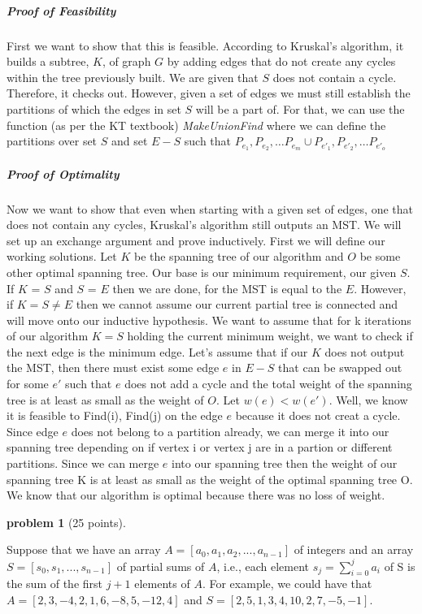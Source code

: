 \documentclass[10pt]{article}
\newtheorem{problem}{\sc\color{cit}problem}
\begin{document}
{\subparagraph{Proof of Feasibility} First we want to show that this is feasible. According to Kruskal's algorithm, it builds a subtree, $K$, of graph $G$ by adding edges that do not create any cycles within the tree
previously built. We are given that $S$ does not contain a cycle. Therefore, it checks out. However, given a set of edges we must still establish the partitions of which the edges in set $S$ will be a part of. 
For that, we can use the function (as per the KT textbook) \textit{MakeUnionFind} where we can define the partitions over set $S$ and set $E - S$ such that ${P_{e_1}, P_{e_2}, \ldots P_{e_m}} \cup {P_{e'_1}, P_{e'_2}, \ldots P_{e'_o}}$ 

\subparagraph{Proof of Optimality} Now we want to show that even when starting with a given set of edges, one that does not contain any cycles, Kruskal's algorithm still outputs an MST. We will set up an exchange argument and prove inductively. 
First we will define our working solutions. Let $K$ be the spanning tree of our algorithm and $O$ be some other optimal spanning tree. Our base is our minimum requirement, our given $S$. If $K$ = $S$ and $S$ = $E$ then we are done,
for the MST is equal to the $E$. However, if $K = S \neq E$ then we cannot assume our current partial tree is connected and will move onto our inductive hypothesis. We want to assume that for k iterations of our algorithm
$K = S$ holding the current minimum weight, we want to check if the next edge is the minimum edge. Let's assume that if our $K$ does not output the MST, then there must exist some edge $e$ in $E - S$ 
that can be swapped out for some $e'$ such that $e$ does not add a cycle and the total weight of the spanning tree is at least as small as the weight of $O$. Let $w(e) < w(e')$. Well, we know it is feasible to Find(i), Find(j) on the edge $e$
because it does not creat a cycle. Since edge $e$ does not belong to a partition already, we can merge it into our spanning tree depending on if vertex i or vertex j are in a partion or different partitions. Since we can merge $e$ into our spanning tree
then the weight of our spanning tree K is at least as small as the weight of the optimal spanning tree O. We know that our algorithm is optimal because there was no loss of weight.   
}

\newpage
\medskip{}


\newpage
\begin{problem}[25 points]    
\end{problem}
Suppose that we have an array $A = [a_0,a_1,a_2,...,a_{n-1}]$ of integers and an array $S = [s_0,s_1,...,s_{n-1}]$ of partial sums of $A$, i.e., each element $s_j = \sum_{i=0}^{j}{a_i}$ of S is the sum of the first $j+1$ elements of $A$. For example, we could have that $A = [2,3,-4,2,1,6,-8,5,-12,4]$ and $S = [2,5,1,3,4,10,2,7,-5,-1]$. 
\end{document}
